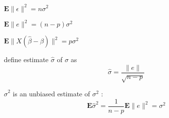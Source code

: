 \begin{theorem}
    $ \mathbf{E}\|\epsilon\|^{2}=n \sigma^{2} $
\end{theorem}

\begin{theorem}
    $ \mathbf{E}\|e\|^{2}=(n-p) \sigma^{2} $
\end{theorem}

\begin{theorem}
    $ \mathbf{E}\|X(\hat{\beta}-\beta)\|^{2}=p \sigma^{2} $
\end{theorem}

\begin{definition}
    define estimate $ \hat{\sigma} $ of $ \sigma $ as
$$
\hat{\sigma}=\frac{\|e\|}{\sqrt{n-p}}
$$
\end{definition}

\begin{theorem}
    $ \hat{\sigma}^{2} $ is an unbiased estimate of $ \sigma^{2} $ :
$$
\mathbf{E} \hat{\sigma}^{2}=\frac{1}{n-p} \mathbf{E}\|e\|^{2}=\sigma^{2}
$$
\end{theorem}


